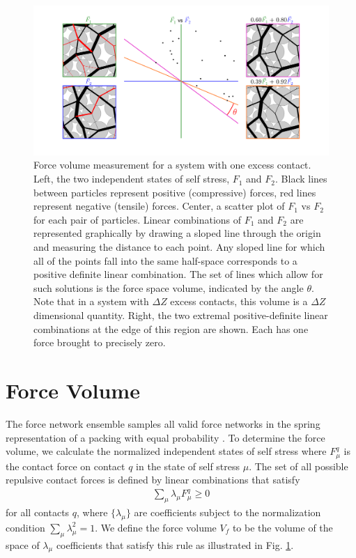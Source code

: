 \begin{figure}[th!]
\centering
\includegraphics[width=\textwidth, trim=150 70 150 70, clip]{forceVolumeEntropyPaper/methodIllustration.pdf}
\caption{Force volume measurement for a system with one excess contact. Left, the two independent states of self stress, $F_1$ and $F_2$. Black lines between particles represent positive (compressive) forces, red lines represent negative (tensile) forces. 
Center, a scatter plot of $F_1$ vs $F_2$ for each pair of particles. Linear combinations of $F_1$ and $F_2$ are represented graphically by drawing a sloped line through the origin and measuring the distance to each point.  Any sloped line for which all of the points fall into the same half-space corresponds to a positive definite linear combination. The set of lines which allow for such solutions is the force space volume, indicated by the angle $\theta$. Note that in a system with $\Delta Z$ excess contacts, this volume is a $\Delta Z$ dimensional quantity.
Right, the two extremal positive-definite linear combinations at the edge of this region are shown. Each has one force brought to precisely zero.}
\label{methodIllustrationFigure}
\end{figure}

\section{Force Volume}
The force network ensemble samples all valid force networks in the spring representation of a packing with equal probability \cite{snoeijer_force_2004,tighe_force_2010,tighe_stress_2011}. 
To determine the force volume, we calculate the normalized independent states of self stress where $F_\mu^q$ is the contact force on contact $q$ in the state of self stress $\mu$.  The set of all possible repulsive contact forces is defined by linear combinations that satisfy
%
\begin{align}
\label{eqn:coefficientCondition}
\sum_\mu \lambda_\mu F_\mu^q \ge 0
\end{align}
%
for all contacts $q$, where $\{\lambda_\mu\}$ are coefficients subject to the normalization condition $\sum_\mu \lambda_\mu^2 = 1$.  We define the force volume $V_f$ to be the volume of the space of $\lambda_\mu$ coefficients that satisfy this rule as illustrated in Fig. \ref{methodIllustrationFigure}.  

